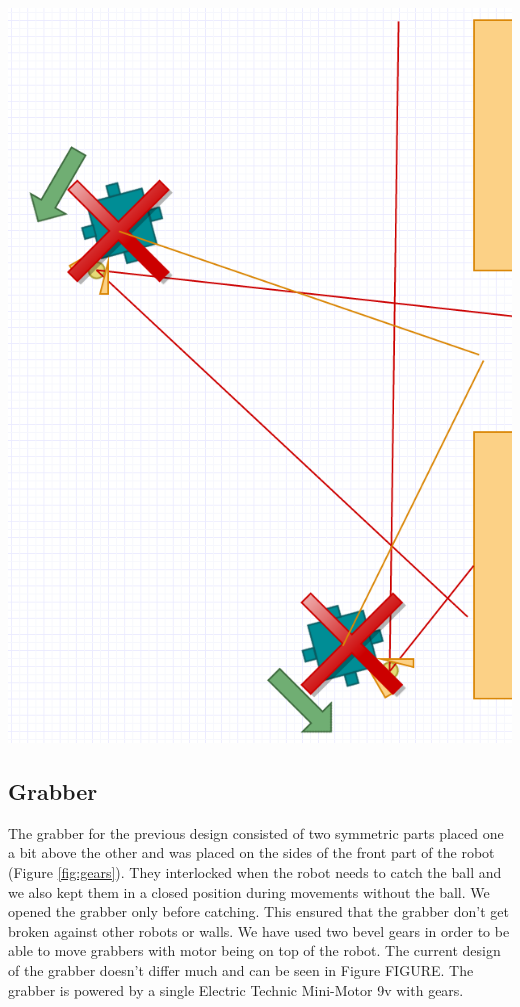 \documentclass[a4paper,12pt]{article}
\begin{document}
\includegraphics[scale=.5]{badkick.png}


\subsection{Grabber}
The grabber for the previous design consisted of two symmetric parts placed one a bit above the other and was placed on the sides of the front part of the robot (Figure \ref{fig:gears}). They interlocked when the robot needs to catch the ball and we also kept them in a closed position during movements without the ball. We opened the grabber only before catching. This ensured that the grabber don't get broken against other robots or walls. We have used two bevel gears in order to be able to move grabbers with motor being on top of the robot. The current design of the grabber doesn't differ much and can be seen in Figure FIGURE. The grabber is powered by a single Electric Technic Mini-Motor 9v with gears.
\end{document}
